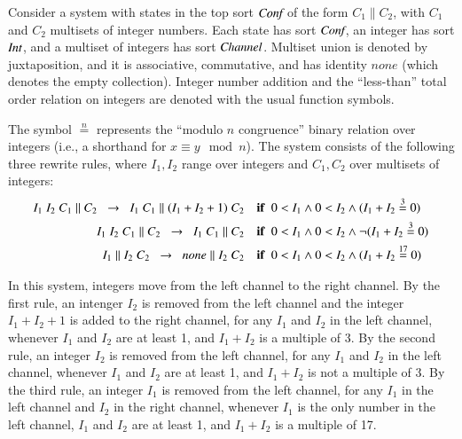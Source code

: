 \begin{example}\label{ex:ch}
Consider a system with states in the top sort $\textit{Conf}$ of the
form $C_1 \parallel C_2$, with $C_1$ and $C_2$ multisets of integer
numbers.
Each state has sort $\textit{Conf}$,
an integer has sort $\textit{Int}$, and a multiset of integers has
sort $\textit{Channel}$.  Multiset union is denoted by juxtaposition,
and it is associative, commutative, and has identity $\textit{none}$
(which denotes the empty collection). Integer number addition and the
``less-than'' total order relation on integers are denoted with the
usual function symbols. 

The symbol $\stackrel{n}{=}$ represents the
``modulo $n$ congruence'' binary relation over integers (i.e., 
a shorthand for $x \equiv y \mod n$).  The
system consists of the following three rewrite rules, where $I_1,I_2$
range over integers and $C_1,C_2$ over multisets of integers:
%
\begin{align*}
  I_1\;I_2\;C_1 \parallel C_2 \; \;\rightarrow \;\;I_1 \; C_1 \parallel (I_1 + I_2 + 1)\;C_2 \quad & \textbf{if} \;\; 0 < I_1 \land 0< I_2 \land (I_1 + I_2 \stackrel{3}{=} 0) \\
  I_1\;I_2\;C_1 \parallel C_2 \;\;\rightarrow\;\;I_1\;C_1 \parallel C_2 \quad & \textbf{if} \;\; 0 < I_1 \land 0< I_2 \land \neg(I_1 + I_2 \stackrel{3}{=} 0) \\
  I_1 \parallel I_2\;C_2 \;\;\rightarrow\;\;\textit{none} \parallel I_2 \;C_2 \quad & \textbf{if}\;\; 0 < I_1 \land 0< I_2 \land (I_1 + I_2 \stackrel{17}{=} 0)
\end{align*}

\noindent In this system, integers move from the left channel to the
right channel.  By the first rule, an intenger $I_2$ is removed from
the left channel and the integer $I_1+I_2+1$ is added to the right
channel, for any $I_1$ and $I_2$ in the left channel, whenever $I_1$
and $I_2$ are at least 1, and $I_1+I_2$ is a multiple of 3. By the
second rule, an integer $I_2$ is removed from the left channel, for
any $I_1$ and $I_2$ in the left channel, whenever $I_1$ and $I_2$ are
at least 1, and $I_1+I_2$ is not a multiple of 3. By the third rule,
an integer $I_1$ is removed from the left channel, for any $I_1$ in
the left channel and $I_2$ in the right channel, whenever $I_1$ is the
only number in the left channel, $I_1$ and $I_2$ are at least 1, and
$I_1+I_2$ is a multiple of 17.
\end{example}

